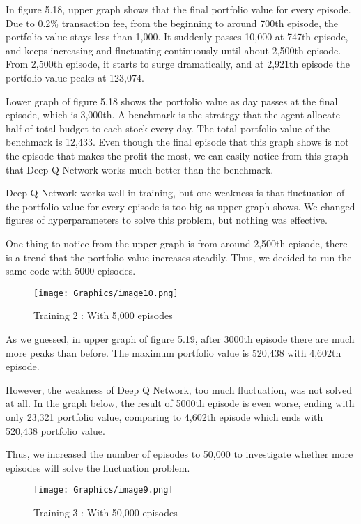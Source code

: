 In figure 5.18, upper graph shows that the final portfolio value for every episode. Due to 0.2\% transaction fee, from the beginning to around 700th episode, the portfolio value stays less than 1,000. It suddenly passes 10,000 at 747th episode, and keeps increasing and  fluctuating continuously until about 2,500th episode. From 2,500th episode, it starts to surge dramatically, and at 2,921th episode the portfolio value peaks at 123,074.  

Lower graph of figure 5.18 shows the portfolio value as day passes at the final episode, which is 3,000th. A benchmark is the strategy that the agent allocate half of total budget to each stock every day. The total portfolio value of the benchmark is 12,433. Even though the final episode that this graph shows is not the episode that makes the profit the most, we can easily notice from this graph that Deep Q Network works much better than the benchmark.  

Deep Q Network works well in training, but one weakness is that fluctuation of the portfolio value for every episode is too big as upper graph shows. We changed figures of hyperparameters to solve this problem, but nothing was effective. 

One thing to notice from the upper graph is from around 2,500th episode, there is a trend that the portfolio value increases steadily. Thus, we decided to run the same code with 5000 episodes.

\begin{figure}[H]
\begin{center}
\texttt{[image: Graphics/image10.png]} \caption{Training 2 : With 5,000 episodes }
\end{center}
\end{figure}

As we guessed, in upper graph of figure 5.19, after 3000th episode there are much more peaks than before. The maximum portfolio value is 520,438 with 4,602th episode. 

However, the weakness of Deep Q Network, too much fluctuation, was not solved at all. In the graph below, the result of 5000th episode is even worse, ending with only 23,321 portfolio value, comparing to 4,602th episode which ends with 520,438 portfolio value. 

Thus, we increased the number of episodes to 50,000 to investigate whether more episodes will solve the fluctuation problem.

\begin{figure}[H]
\begin{center}
\texttt{[image: Graphics/image9.png]} \caption{Training 3 : With 50,000 episodes }
\end{center}
\end{figure}


